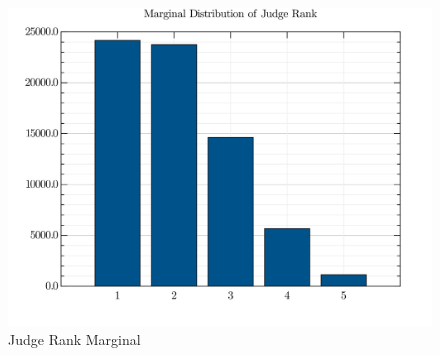 \documentclass[12pt,a4paper]{article}
\begin{document}
 \begin{figure}
\centering
\includegraphics{visuals/marginals_RANK.png}
\caption{Judge Rank Marginal}
\end{figure}
\end{document}
